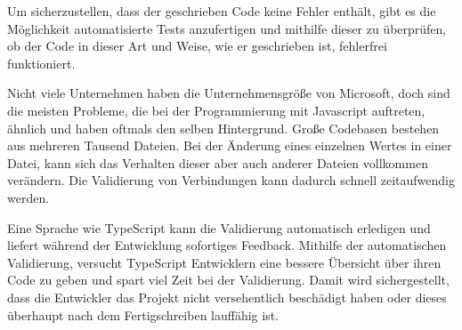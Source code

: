 Um sicherzustellen, dass der geschrieben Code keine Fehler enthält, gibt es die Möglichkeit automatisierte Tests anzufertigen und mithilfe dieser zu überprüfen, ob der Code in dieser Art und Weise, wie er geschrieben ist, fehlerfrei funktioniert. \cite{ScriptWiki}


Nicht viele Unternehmen haben die Unternehmensgröße von Microsoft, doch sind die meisten Probleme, die bei der Programmierung mit Javascript auftreten, ähnlich und haben oftmals den selben Hintergrund. Große Codebasen bestehen aus mehreren Tausend Dateien. Bei der Änderung eines einzelnen Wertes in einer Datei, kann sich das Verhalten dieser aber auch anderer Dateien vollkommen verändern.
Die Validierung von Verbindungen kann dadurch schnell zeitaufwendig werden.\cite{ScriptWiki}


Eine Sprache wie TypeScript kann die Validierung automatisch erledigen und liefert während der Entwicklung sofortiges Feedback. Mithilfe der automatischen Validierung, versucht TypeScript Entwicklern eine bessere Übersicht über ihren Code zu geben und spart viel Zeit bei der Validierung. Damit wird sichergestellt, dass die Entwickler das Projekt nicht versehentlich beschädigt haben oder dieses überhaupt nach dem Fertigschreiben lauffähig ist. \cite{ScriptWiki}
